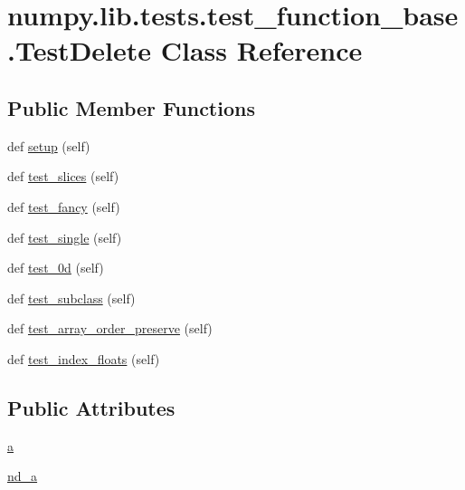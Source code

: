\hypertarget{classnumpy_1_1lib_1_1tests_1_1test__function__base_1_1TestDelete}{}\section{numpy.\+lib.\+tests.\+test\+\_\+function\+\_\+base.\+Test\+Delete Class Reference}
\label{classnumpy_1_1lib_1_1tests_1_1test__function__base_1_1TestDelete}
\subsection*{Public Member Functions}
\begin{DoxyCompactItemize}
\item 
def \hyperlink{classnumpy_1_1lib_1_1tests_1_1test__function__base_1_1TestDelete_a27ba572db646eed03b53b36280dbbda5}{setup} (self)
\item 
def \hyperlink{classnumpy_1_1lib_1_1tests_1_1test__function__base_1_1TestDelete_a26cab04b1648bcb6b8f5c07800ba55d9}{test\+\_\+slices} (self)
\item 
def \hyperlink{classnumpy_1_1lib_1_1tests_1_1test__function__base_1_1TestDelete_aaf5bfbe673173a8e3523aa763db63236}{test\+\_\+fancy} (self)
\item 
def \hyperlink{classnumpy_1_1lib_1_1tests_1_1test__function__base_1_1TestDelete_a0e921407a1a489153f148a612d5b0b9e}{test\+\_\+single} (self)
\item 
def \hyperlink{classnumpy_1_1lib_1_1tests_1_1test__function__base_1_1TestDelete_a80f0ca16c8bb5fc09fac572237c5aa03}{test\+\_\+0d} (self)
\item 
def \hyperlink{classnumpy_1_1lib_1_1tests_1_1test__function__base_1_1TestDelete_a931d44bc8b9c2497db4cc3be22f9ed8b}{test\+\_\+subclass} (self)
\item 
def \hyperlink{classnumpy_1_1lib_1_1tests_1_1test__function__base_1_1TestDelete_a1a5a3287953ce494598e5d3a1125ad03}{test\+\_\+array\+\_\+order\+\_\+preserve} (self)
\item 
def \hyperlink{classnumpy_1_1lib_1_1tests_1_1test__function__base_1_1TestDelete_aed6ba922fd31bdc3d79dfc2b651c3b8c}{test\+\_\+index\+\_\+floats} (self)
\end{DoxyCompactItemize}
\subsection*{Public Attributes}
\begin{DoxyCompactItemize}
\item 
\hyperlink{classnumpy_1_1lib_1_1tests_1_1test__function__base_1_1TestDelete_ae774c415818f00339da26ad3883b6174}{a}
\item 
\hyperlink{classnumpy_1_1lib_1_1tests_1_1test__function__base_1_1TestDelete_a9e333456f9ef63001b0163c5d9b8fb46}{nd\+\_\+a}
\end{DoxyCompactItemize}


